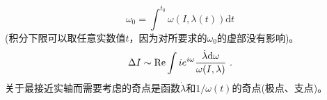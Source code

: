 \documentclass[11pt,a4paper]{article}
\newcommand{\dif}{\mathrm{d}}
\begin{document}
\begin{equation}
\omega_0 = \int^{t_0} \omega(I, \lambda(t) ) \dif t
\end{equation}
(积分下限可以取任意实数值$t$，因为对所要求的$\omega_0$的虚部没有影响)。
\begin{equation}
\Delta I \sim {\rm Re} \int i e^{i\omega} \frac{\dot \lambda \dif \omega}{\omega(I, \lambda) } ~.
\end{equation}
关于最接近实轴而需要考虑的奇点是函数$\dot \lambda$和$1/ \omega(t)$的奇点(极点、支点)。












































\end{document}
